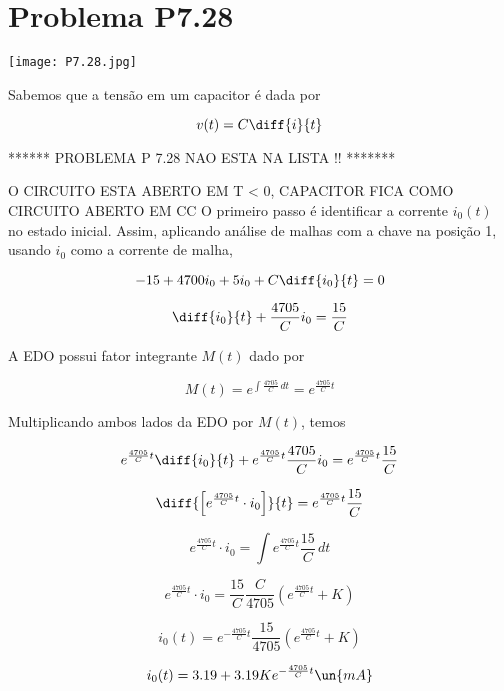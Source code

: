 
\section*{Problema P7.28}

\renewcommand*\thesection{7.28}

\begin{center}
    \texttt{[image: P7.28.jpg]}
\end{center}

Sabemos que a tensão em um capacitor é dada por	

\begin{equation}\label{eq:7.28.1}
    v(t) = C\diff{i}{t}
\end{equation}

****** PROBLEMA P 7.28 NAO ESTA NA LISTA !! *******

O CIRCUITO ESTA ABERTO EM T < 0, CAPACITOR FICA COMO CIRCUITO ABERTO EM CC
O primeiro passo é identificar a corrente $i_0(t)$ no estado inicial. Assim, aplicando análise de malhas com a chave na posição 1, usando $i_0$ como a corrente de malha,

\[ -15 + 4700i_0 + 5i_0 + C\diff{i_0}{t} = 0 \]

\[ \diff{i_0}{t} + \frac{4705}{C}i_0 = \frac{15}{C}\]

A EDO possui fator integrante $M(t)$ dado por 

\[ M(t) = e^{\int \frac{4705}{C} \, dt}  = e^{\frac{4705}{C}t} \]

Multiplicando ambos lados da EDO por $M(t)$, temos

\[ e^{\frac{4705}{C}t}\diff{i_0}{t} + e^{\frac{4705}{C}t}\frac{4705}{C}i_0 = e^{\frac{4705}{C}t} \frac{15}{C}\]

\[ \diff{\left[e^{\frac{4705}{C}t} \cdot i_0\right]}{t} = e^{\frac{4705}{C}t} \frac{15}{C}\]

\[ e^{\frac{4705}{C}t} \cdot i_0 = \int e^{\frac{4705}{C}t} \frac{15}{C} \, dt \]

\[ e^{\frac{4705}{C}t} \cdot i_0 = \frac{15}{C} \frac{C}{4705} \left(e^{\frac{4705}{C}t} + K\right) \]

\[ i_0(t) = e^{-\frac{4705}{C}t} \frac{15}{4705}\left(e^{\frac{4705}{C}t} + K\right) \]

\[ i_0(t) = 3.19 + 3.19Ke^{-\frac{4705}{C}t} \un{mA} \]










